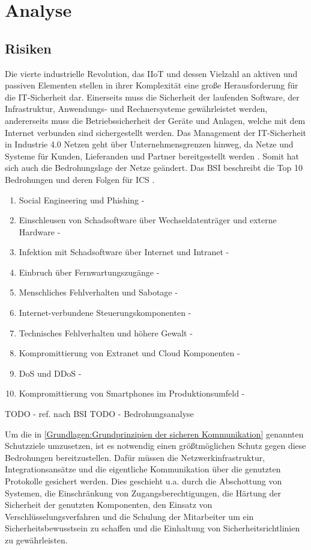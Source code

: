 \chapter{Analyse}
\section{Risiken}
Die vierte industrielle Revolution, das \ac{IIoT} und dessen Vielzahl an aktiven und passiven Elementen stellen in ihrer Komplexität eine große Herausforderung für die IT-Sicherheit dar. Einerseits muss die Sicherheit der laufenden Software, der Infrastruktur, Anwendungs- und Rechnersysteme gewährleistet werden, andererseits muss die Betriebssicherheit der Geräte und Anlagen, welche mit dem Internet verbunden sind sichergestellt werden. Das Management der IT-Sicherheit in Industrie 4.0 Netzen geht über Unternehmensgrenzen hinweg, da Netze und Systeme für Kunden, Lieferanden und Partner bereitgestellt werden \cite{DTAG2016}. Somit hat sich auch die Bedrohungslage der Netze geändert. Das \ac{BSI} beschreibt die Top 10 Bedrohungen und deren Folgen für \ac{ICS} \cite{ICSSec2016}.

\begin{enumerate}
    \item Social Engineering und Phishing - 
    \item Einschleusen von Schadsoftware über Wechseldatenträger und externe Hardware - 
    \item Infektion mit Schadsoftware über Internet und Intranet - 
    \item Einbruch über Fernwartungszugänge - 
    \item Menschliches Fehlverhalten und Sabotage - 
    \item Internet-verbundene Steuerungskomponenten - 
    \item Technisches Fehlverhalten und höhere Gewalt - 
    \item Kompromittierung von Extranet und Cloud Komponenten - 
    \item \ac{DoS} und \ac{DDoS} - 
    \item Kompromittierung von Smartphones im Produktionsumfeld - 
\end{enumerate}

TODO - ref. nach BSI
TODO - Bedrohungsanalyse

Um die in \autoref{Grundlagen:Grundprinzipien der sicheren Kommunikation} genannten Schutzziele umzusetzen, ist es notwendig einen größtmöglichen Schutz gegen diese Bedrohungen bereitzustellen. Dafür müssen die Netzwerkinfrastruktur, Integrationsansätze und die eigentliche Kommunikation über die genutzten Protokolle gesichert werden. Dies geschieht u.a. durch die Abschottung von Systemen, die Einschränkung von Zugangsberechtigungen, die Härtung der Sicherheit der genutzten Komponenten, den Einsatz von Verschlüsselungsverfahren und die Schulung der Mitarbeiter um ein Sicherheitsbewusstsein zu schaffen und die Einhaltung von Sicherheitsrichtlinien zu gewährleisten.

